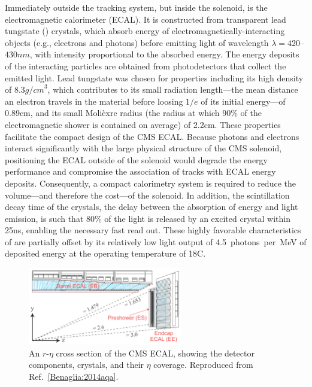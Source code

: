 Immediately outside the tracking system, but inside the solenoid, is the electromagnetic 
calorimeter (ECAL). It is constructed from transparent lead tungstate (\PbT) crystals, which
absorb energy of electromagnetically-interacting objects (e.g., electrons and photons) before emitting
light of wavelength $\lambda = 420$--$430\unit{nm}$, with intensity proportional to the absorbed energy.
The energy deposits of the interacting particles are obtained from
photodetectors that collect the emitted light.
Lead tungstate was chosen for properties including its high density of $8.3\unit{g/cm}^3$, which contributes
to its small radiation length---the mean distance an electron travels
in the material before loosing $1/e$ of its initial energy---of 0.89\unit{cm},
and its small Moli{\`e}xre radius (the radius at which 90\% of the electromagnetic
shower is contained on average) of 2.2\unit{cm}. These properties facilitate the 
compact design of the CMS ECAL. Because photons and electrons interact significantly
with the large physical structure of the CMS solenoid, positioning the ECAL outside
of the solenoid would degrade the energy performance and compromise the association
of tracks with ECAL energy deposits.
Consequently, a compact calorimetry system
is required to reduce the volume---and therefore the cost---of the solenoid.
In addition, the scintillation decay time of the crystals, the delay between the absorption of energy and light emission,
is such that 80\% of the light is released by an excited crystal within 25\unit{ns},
enabling the necessary fast read out. These highly favorable characteristics of {\PbT} are 
partially offset by its relatively low light output of 4.5~photons~per~MeV of deposited energy
at the operating temperature of 18\degree\unit{C}. 

\begin{figure}[htbp]
  \centering
   \includegraphics[width=0.6\textwidth]{figures/LHCandCMS/ecalCrossSection.png}
  \caption[An $r$-$\eta$ cross section of the CMS ECAL]{
    An $r$-$\eta$ cross section of the CMS ECAL, showing the detector components,
    crystals, and their $\eta$ coverage. Reproduced from Ref.~\ref{Benaglia:2014aqa}.
        }
 \label{fig:ecal}
\end{figure}

